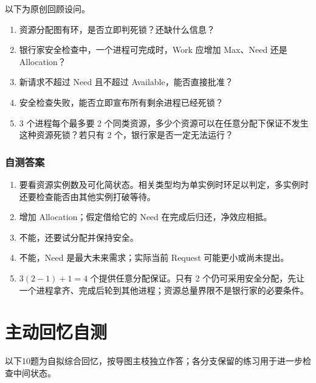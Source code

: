 以下为原创回顾设问。

\begin{enumerate}
\def\labelenumi{\arabic{enumi}.}
\tightlist
\item
  资源分配图有环，是否立即判死锁？还缺什么信息？
\item
  银行家安全检查中，一个进程可完成时，Work 应增加 Max、Need 还是 Allocation？
\item
  新请求不超过 Need 且不超过 Available，能否直接批准？
\item
  安全检查失败，能否立即宣布所有剩余进程已经死锁？
\item
  3 个进程每个最多要 2 个同类资源，多少个资源可以在任意分配下保证不发生这种资源死锁？若只有 2 个，银行家是否一定无法运行？
\end{enumerate}

\subsubsection{自测答案}\label{OS02-auto-30}

\begin{enumerate}
\def\labelenumi{\arabic{enumi}.}
\tightlist
\item
  要看资源实例数及可化简状态。相关类型均为单实例时环足以判定，多实例时还要检查能否由其他实例打破等待。
\item
  增加 Allocation；假定借给它的 Need 在完成后归还，净效应相抵。
\item
  不能，还要试分配并保持安全。
\item
  不能，Need 是最大未来需求；实际当前 Request 可能更小或尚未提出。
\item
  \(3(2-1)+1=4\) 个提供任意分配保证。只有 2 个仍可采用安全分配，先让一个进程拿齐、完成后轮到其他进程；资源总量界限不是银行家的必要条件。
\end{enumerate}

\section{主动回忆自测}\label{OS02-recall}

以下10题为自拟综合回忆，按导图主枝独立作答；各分支保留的练习用于进一步检查中间状态。

